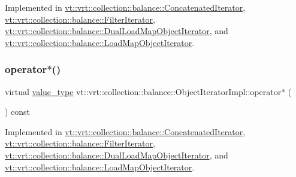Implemented in \hyperlink{structvt_1_1vrt_1_1collection_1_1balance_1_1_concatenated_iterator_ad19f57e2365b42bf0739afc2616602c2}{vt\+::vrt\+::collection\+::balance\+::\+Concatenated\+Iterator}, \hyperlink{structvt_1_1vrt_1_1collection_1_1balance_1_1_filter_iterator_a3c92442ef2c78f8bd7bc2f03d06c11a1}{vt\+::vrt\+::collection\+::balance\+::\+Filter\+Iterator}, \hyperlink{structvt_1_1vrt_1_1collection_1_1balance_1_1_dual_load_map_object_iterator_ab4a90db790a06e69ab1056e3043e27ae}{vt\+::vrt\+::collection\+::balance\+::\+Dual\+Load\+Map\+Object\+Iterator}, and \hyperlink{structvt_1_1vrt_1_1collection_1_1balance_1_1_load_map_object_iterator_a42b545ead5d94d4a07478977d70567da}{vt\+::vrt\+::collection\+::balance\+::\+Load\+Map\+Object\+Iterator}.

\mbox{\label{structvt_1_1vrt_1_1collection_1_1balance_1_1_object_iterator_impl_a361451a08b7d2361ee9f0e5b3c35c089}} 
\subsubsection{\texorpdfstring{operator$\ast$()}{operator*()}}
{\footnotesize\ttfamily virtual \hyperlink{structvt_1_1vrt_1_1collection_1_1balance_1_1_object_iterator_impl_a8a38ab2c722e341d729f61cb59112376}{value\+\_\+type} vt\+::vrt\+::collection\+::balance\+::\+Object\+Iterator\+Impl\+::operator$\ast$ (\begin{DoxyParamCaption}{ }\end{DoxyParamCaption}) const\hspace{0.3cm}{\ttfamily [pure virtual]}}



Implemented in \hyperlink{structvt_1_1vrt_1_1collection_1_1balance_1_1_concatenated_iterator_abbd9041193bd96a5d56c65ba8f2276fe}{vt\+::vrt\+::collection\+::balance\+::\+Concatenated\+Iterator}, \hyperlink{structvt_1_1vrt_1_1collection_1_1balance_1_1_filter_iterator_a4812753d95ef26ea45dc053adc07cd3f}{vt\+::vrt\+::collection\+::balance\+::\+Filter\+Iterator}, \hyperlink{structvt_1_1vrt_1_1collection_1_1balance_1_1_dual_load_map_object_iterator_a196f4c50ef27bde15a3ed905be60889b}{vt\+::vrt\+::collection\+::balance\+::\+Dual\+Load\+Map\+Object\+Iterator}, and \hyperlink{structvt_1_1vrt_1_1collection_1_1balance_1_1_load_map_object_iterator_a2f9011bf25bb74168d62db39b0f33d81}{vt\+::vrt\+::collection\+::balance\+::\+Load\+Map\+Object\+Iterator}.


